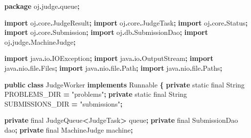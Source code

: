 \documentclass[
  11pt,
]{ctexart}
\newenvironment{Shaded}{\begin{snugshade}}{\end{snugshade}}
\newcommand{\BuiltInTok}[1]{#1}
\newcommand{\DataTypeTok}[1]{\textcolor[rgb]{0.13,0.29,0.53}{#1}}
\newcommand{\ImportTok}[1]{#1}
\newcommand{\KeywordTok}[1]{\textcolor[rgb]{0.13,0.29,0.53}{\textbf{#1}}}
\newcommand{\NormalTok}[1]{#1}
\newcommand{\OperatorTok}[1]{\textcolor[rgb]{0.81,0.36,0.00}{\textbf{#1}}}
\newcommand{\StringTok}[1]{\textcolor[rgb]{0.31,0.60,0.02}{#1}}
\begin{document}
\begin{Shaded}
\begin{Highlighting}[]
\KeywordTok{package}\ImportTok{ oj}\OperatorTok{.}\ImportTok{judge}\OperatorTok{.}\ImportTok{queue}\OperatorTok{;}

\KeywordTok{import} \ImportTok{oj}\OperatorTok{.}\ImportTok{core}\OperatorTok{.}\ImportTok{JudgeResult}\OperatorTok{;}
\KeywordTok{import} \ImportTok{oj}\OperatorTok{.}\ImportTok{core}\OperatorTok{.}\ImportTok{JudgeTask}\OperatorTok{;}
\KeywordTok{import} \ImportTok{oj}\OperatorTok{.}\ImportTok{core}\OperatorTok{.}\ImportTok{Status}\OperatorTok{;}
\KeywordTok{import} \ImportTok{oj}\OperatorTok{.}\ImportTok{core}\OperatorTok{.}\ImportTok{Submission}\OperatorTok{;}
\KeywordTok{import} \ImportTok{oj}\OperatorTok{.}\ImportTok{db}\OperatorTok{.}\ImportTok{SubmissionDao}\OperatorTok{;}
\KeywordTok{import} \ImportTok{oj}\OperatorTok{.}\ImportTok{judge}\OperatorTok{.}\ImportTok{MachineJudge}\OperatorTok{;}

\KeywordTok{import} \ImportTok{java}\OperatorTok{.}\ImportTok{io}\OperatorTok{.}\ImportTok{IOException}\OperatorTok{;}
\KeywordTok{import} \ImportTok{java}\OperatorTok{.}\ImportTok{io}\OperatorTok{.}\ImportTok{OutputStream}\OperatorTok{;}
\KeywordTok{import} \ImportTok{java}\OperatorTok{.}\ImportTok{nio}\OperatorTok{.}\ImportTok{file}\OperatorTok{.}\ImportTok{Files}\OperatorTok{;}
\KeywordTok{import} \ImportTok{java}\OperatorTok{.}\ImportTok{nio}\OperatorTok{.}\ImportTok{file}\OperatorTok{.}\ImportTok{Path}\OperatorTok{;}
\KeywordTok{import} \ImportTok{java}\OperatorTok{.}\ImportTok{nio}\OperatorTok{.}\ImportTok{file}\OperatorTok{.}\ImportTok{Paths}\OperatorTok{;}

\KeywordTok{public} \KeywordTok{class}\NormalTok{ JudgeWorker }\KeywordTok{implements} \BuiltInTok{Runnable} \OperatorTok{\{}
    \KeywordTok{private} \DataTypeTok{static} \DataTypeTok{final} \BuiltInTok{String}\NormalTok{ PROBLEMS\_DIR    }\OperatorTok{=} \StringTok{"problems"}\OperatorTok{;}
    \KeywordTok{private} \DataTypeTok{static} \DataTypeTok{final} \BuiltInTok{String}\NormalTok{ SUBMISSIONS\_DIR }\OperatorTok{=} \StringTok{"submissions"}\OperatorTok{;}

    \KeywordTok{private} \DataTypeTok{final}\NormalTok{ JudgeQueue}\OperatorTok{\textless{}}\NormalTok{JudgeTask}\OperatorTok{\textgreater{}}\NormalTok{ queue}\OperatorTok{;}
    \KeywordTok{private} \DataTypeTok{final}\NormalTok{ SubmissionDao dao}\OperatorTok{;}
    \KeywordTok{private} \DataTypeTok{final}\NormalTok{ MachineJudge machine}\OperatorTok{;}


\end{Highlighting}
\end{Shaded}
\end{document}
